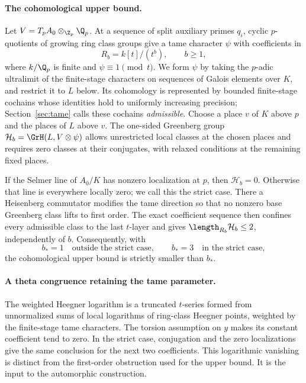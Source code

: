 \paragraph{The cohomological upper bound.}
Let $V=T_pA_0\otimes_{\Z_p}\Q_p$. At a sequence of split auxiliary
primes $q_i$, cyclic $p$-quotients of growing ring class groups give
a tame character $\psi$ with coefficients in
\[
 R_b=k[t]/(t^b),\qquad b\ge1,
\]
where $k/\Q_p$ is finite and $\psi\equiv1\pmod t$.
We form $\psi$ by taking the $p$-adic
ultralimit of the finite-stage characters on sequences of Galois
elements over $K$, and restrict it to $L$ below.
Its cohomology is represented by
bounded finite-stage cochains whose identities hold to uniformly
increasing precision; Section~\ref{sec:tame} calls these cochains
\emph{admissible}.
Choose a place $v$ of $K$ above $p$ and the places of $L$ above $v$.
The one-sided Greenberg group
$\mathcal H_b=\GrH(L,V\otimes\psi)$ allows unrestricted local
classes at the chosen places and requires zero classes at their
conjugates, with relaxed conditions at the remaining fixed places.

If the Selmer line of $A_0/K$ has nonzero localization at $p$, then
$\mathcal H_b=0$. Otherwise that line is everywhere locally zero;
we call this the strict case. There a Heisenberg commutator modifies
the tame direction so
that no nonzero base Greenberg class lifts to first order. The exact
coefficient sequence then confines every admissible class to the
last $t$-layer and gives $\length_{R_b}\mathcal H_b\le2$, independently
of $b$. Consequently, with
\[
 b_*=1\quad\text{outside the strict case},\qquad
 b_*=3\quad\text{in the strict case},
\]
the cohomological upper bound is strictly smaller than $b_*$.

\paragraph{A theta congruence retaining the tame parameter.}
The weighted Heegner logarithm is a truncated $t$-series formed from
unnormalized sums of local logarithms of ring-class Heegner points, weighted
by the finite-stage tame characters. The torsion assumption on $y$
makes its constant coefficient tend to zero. In the strict case,
conjugation and the zero localizations give the same conclusion for
the next two coefficients. This logarithmic vanishing is distinct
from the first-order obstruction used for the upper bound. It is
the input to the automorphic construction.

